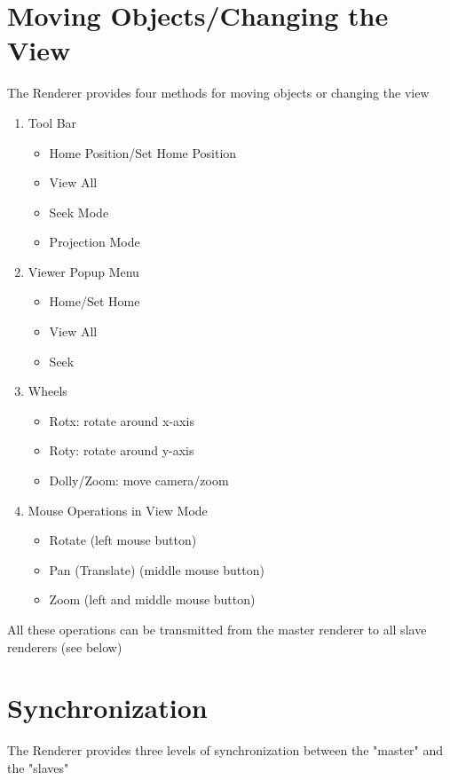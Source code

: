 \begin{htmlonly}
\section{Moving Objects/Changing the View}

The Renderer provides four methods for moving objects or changing the view

\begin{enumerate}
\item Tool Bar
      \begin{itemize}
      \item Home Position/Set Home Position
      \item View All
      \item Seek Mode
      \item Projection Mode 
      \end{itemize}
\item Viewer Popup Menu
      \begin{itemize}
      \item Home/Set Home 
      \item View All
      \item Seek 
      \end{itemize}      
\item Wheels
      \begin{itemize}
      \item Rotx: rotate around x-axis
      \item Roty: rotate around y-axis
      \item Dolly/Zoom: move camera/zoom
      \end{itemize}
\item Mouse Operations in View Mode
      \begin{itemize}
      \item Rotate (left mouse button)
      \item Pan (Translate)  (middle mouse button)
      \item Zoom (left and middle mouse button) 
      \end{itemize}
\end{enumerate}

All these operations can be transmitted from the master renderer to all slave renderers (see
below)

\section{Synchronization}

The Renderer provides three levels of synchronization between the "master" and the "slaves"


\end{htmlonly}
